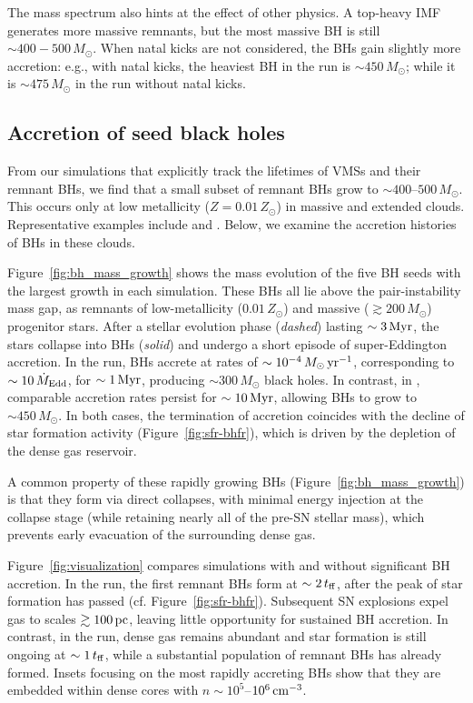 \documentclass[twocolumn]{aastex631}
\begin{document}
The mass spectrum also hints at the effect of other physics. A top-heavy IMF generates more massive remnants, but the most massive BH is still $\sim 400-500\,M_\odot$. When natal kicks are not considered, the BHs gain slightly more accretion: e.g., with natal kicks, the heaviest BH in the  run is $\sim 450\,M_\odot$; while it is $\sim 475\,M_\odot$ in the run without natal kicks.

\subsection{Accretion of seed black holes}

From our simulations that explicitly track the lifetimes of VMSs and their remnant BHs, we find that a small subset of remnant BHs grow to $\sim 400$--$500\,M_\odot$. This occurs only at low metallicity ($Z=0.01\,Z_\odot$) in massive and extended clouds. Representative examples include  and . Below, we examine the accretion histories of BHs in these clouds.

Figure~\ref{fig:bh_mass_growth} shows the mass evolution of the five BH seeds with the largest growth in each simulation. These BHs all lie above the pair-instability mass gap, as remnants of low-metallicity ($0.01\,Z_\odot$) and massive ($\gtrsim 200\,M_\odot$) progenitor stars. After a stellar evolution phase (\emph{dashed}) lasting $\sim 3\,\rm Myr$, the stars collapse into BHs (\emph{solid}) and undergo a short episode of super-Eddington accretion. In the  run, BHs accrete at rates of $\sim 10^{-4}\,M_\odot\,{\rm yr}^{-1}$, corresponding to $\sim 10\,\dot M_{\rm Edd}$, for $\sim 1\,\rm Myr$, producing $\sim 300\,M_\odot$ black holes. In contrast, in , comparable accretion rates persist for $\sim 10\,\rm Myr$, allowing BHs to grow to $\sim 450\,M_\odot$. In both cases, the termination of accretion coincides with the decline of star formation activity (Figure~\ref{fig:sfr-bhfr}), which is driven by the depletion of the dense gas reservoir.

A common property of these rapidly growing BHs (Figure~\ref{fig:bh_mass_growth}) is that they form via direct collapses, with minimal energy injection at the collapse stage (while retaining nearly all of the pre-SN stellar mass), which prevents early evacuation of the surrounding dense gas.

Figure~\ref{fig:visualization} compares simulations with and without significant BH accretion. In the  run, the first remnant BHs form at $\sim 2\,t_{\rm ff}$, after the peak of star formation has passed (cf. Figure~\ref{fig:sfr-bhfr}). Subsequent SN explosions expel gas to scales $\gtrsim 100\,\rm pc$, leaving little opportunity for sustained BH accretion. In contrast, in the  run, dense gas remains abundant and star formation is still ongoing at $\sim 1\,t_{\rm ff}$, while a substantial population of remnant BHs has already formed. Insets focusing on the most rapidly accreting BHs show that they are embedded within dense cores with $n \sim 10^{5}$--$10^{6}\,\rm cm^{-3}$.
\end{document}
